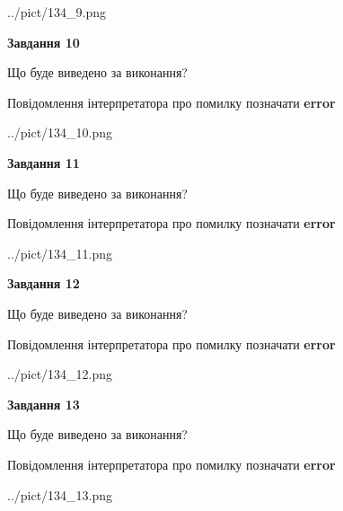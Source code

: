 \documentclass[11pt, ukrainian]{article}
\begin{document}
{\begin {large}
\begin{center}
	{../pict/134_9.png}
\end{center}
\newpage

{\begin {center}\textbf{Завдання 10}\end {center}}\par
Що буде виведено за виконання? \par
Повідомлення інтерпретатора про помилку позначати \textbf{error}

\begin{center}
	{../pict/134_10.png}
\end{center}
\newpage

{\begin {center}\textbf{Завдання 11}\end {center}}\par
Що буде виведено за виконання? \par
Повідомлення інтерпретатора про помилку позначати \textbf{error}

\begin{center}
	{../pict/134_11.png}
\end{center}
\newpage

{\begin {center}\textbf{Завдання 12}\end {center}}\par
Що буде виведено за виконання? \par
Повідомлення інтерпретатора про помилку позначати \textbf{error}

\begin{center}
	{../pict/134_12.png}
\end{center}
\newpage

{\begin {center}\textbf{Завдання 13}\end {center}}\par
Що буде виведено за виконання? \par
Повідомлення інтерпретатора про помилку позначати \textbf{error}

\begin{center}
	{../pict/134_13.png}
\end{center}
\newpage


\end{large}}
\end{document}
